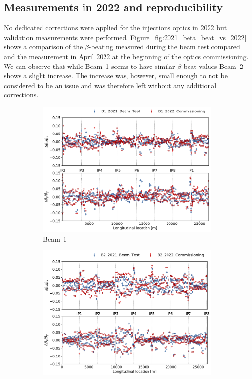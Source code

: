 \documentclass[a4paper]{cernatsnote}
\begin{document}
\subsection{Measurements in 2022 and reproducibility}\label{sec:repro}
No dedicated corrections were applied for the injections optics in 2022 but validation measurements were performed. Figure~\ref{fig:2021_beta_beat_vs_2022} shows a comparison of the $\beta$-beating measured during the beam test compared and the measurement in April 2022 at the beginning of the optics commissioning. We can observe that while Beam~1 seems to have similar $\beta$-beat values Beam~2 shows a slight increase. The increase was, however, small enough to not be considered to be an issue and was therefore left without any additional corrections. 


\begin{figure}[ht]
\begin{subfigure}{.5\textwidth}
  \centering
  \includegraphics[width=.99\linewidth]{plots/beam1/lhcb1_betabeat_vs_beamtest.pdf}  
  \caption{Beam~1}
\end{subfigure}
\begin{subfigure}{.5\textwidth}
  \centering
  \includegraphics[width=.99\linewidth]{plots/beam2/lhcb2_betabeat_vs_beamtest.pdf}  

\end{subfigure}
\end{figure}
\end{document}
